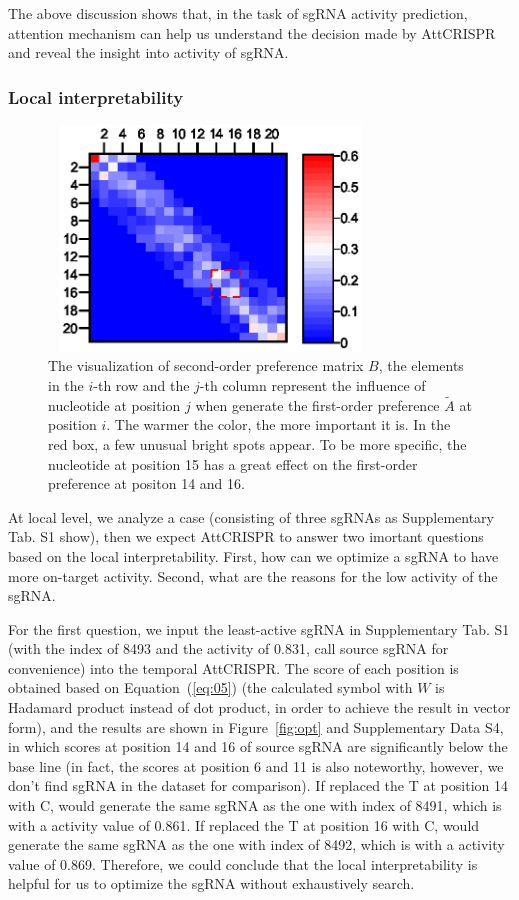 \documentclass{bioinfo}
\begin{document}
The above discussion shows that, in the task of sgRNA activity prediction, 
attention mechanism can help us understand the decision made by AttCRISPR and reveal the insight into activity of sgRNA. 

\subsubsection{Local interpretability}\label{section:local}

\begin{figure}[!tpb]
    \centerline{\includegraphics[width=86mm,height=60mm]{secondorder.eps}}
    \caption{The visualization of second-order preference matrix $B$, 
the elements in the $i$-th row and the $j$-th column represent the influence of nucleotide at position $j$ when generate the first-order preference $\tilde{A}$ at position $i$. 
The warmer the color, the more important it is. 
In the red box, a few unusual bright spots appear. 
To be more specific, the nucleotide at position 15 has a great effect on the first-order preference at positon 14 and 16.
}\label{fig:heatmap}
\end{figure}
At local level, we analyze a case (consisting of three sgRNAs as Supplementary Tab. S1 show), 
then we expect AttCRISPR to answer two imortant questions based on the local interpretability. 
First, how can we optimize a sgRNA to have more on-target activity. 
Second, what are the reasons for the low activity of the sgRNA. 

For the first question, we input the least-active sgRNA in Supplementary Tab. S1 (with the index of 8493 and the activity of 0.831, call source sgRNA for convenience) into the temporal AttCRISPR. 
The score of each position is obtained based on Equation~(\ref{eq:05}) (the calculated symbol with $W$ is Hadamard product instead of dot product, in order to achieve the result in vector form), 
and the results are shown in Figure~\ref{fig:opt} and Supplementary Data S4, in which scores at position 14 and 16 of source sgRNA are significantly below the base line 
(in fact, the scores at position 6 and 11 is also noteworthy, however, we don't find sgRNA in the dataset for comparison). 
If replaced the T at position 14 with C, would generate the same sgRNA as the one with index of 8491, which is with a activity value of 0.861. 
If replaced the T at position 16 with C, would generate the same sgRNA as the one with index of 8492, which is with a activity value of 0.869. 
Therefore, we could conclude that the local interpretability is helpful for us to optimize the sgRNA without exhaustively search.
\end{document}
